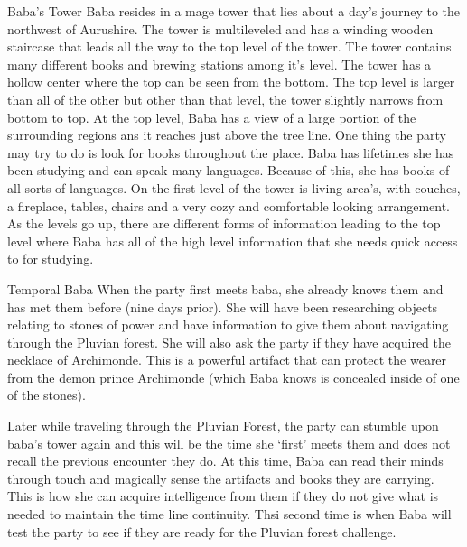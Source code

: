 \begin{commentbox}{Baba's Tower}
	Baba resides in a mage tower that lies about a day's journey to the northwest of Aurushire. The tower is multileveled and has a winding wooden staircase that leads all the way to the top level of the tower. The tower contains many different books and brewing stations among it's level. The tower has a hollow center where the top can be seen from the bottom. The top level is larger than all of the other but other than that level, the tower slightly narrows from bottom to top. At the top level, Baba has a view of a large portion of the surrounding regions ans it reaches just above the tree line. One thing the party may try to do is look for books throughout the place. Baba has lifetimes she has been studying and can speak many languages. Because of this, she has books of all sorts of languages. On the first level of the tower is living area's, with couches, a fireplace, tables, chairs and a very cozy and comfortable looking arrangement. As the levels go up, there are different forms of information leading to the top level where Baba has all of the high level information that she needs quick access to for studying.
\end{commentbox}

\begin{commentbox}{Temporal Baba}
	When the party first meets baba, she already knows them and has met them before (nine days prior). She will have been researching objects relating to stones of power and have information to give them about navigating through the Pluvian forest. She will also ask the party if they have acquired the necklace of Archimonde. This is a powerful artifact that can protect the wearer from the demon prince Archimonde (which Baba knows is concealed inside of one of the stones). 
	
	Later while traveling through the Pluvian Forest, the party can stumble upon baba's tower again and this will be the time she `first' meets them and does not recall the previous encounter they do. At this time, Baba can read their minds through touch and magically sense the artifacts and books they are carrying. This is how she can acquire intelligence from them if they do not give what is needed to maintain the time line continuity. Thsi second time is when Baba will test the party to see if they are ready for the Pluvian forest challenge.
\end{commentbox}


